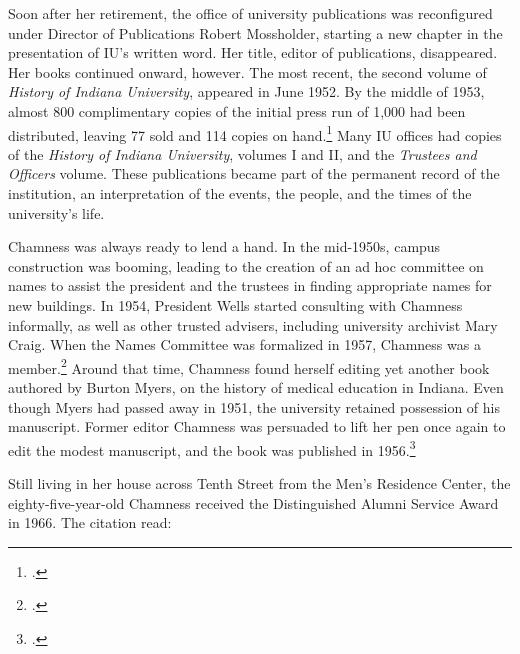 \documentclass[
  american,
  letterpaper,
]{scrreprt}
\begin{document}
Soon after her retirement, the office of university publications was
reconfigured under Director of Publications Robert Mossholder, starting
a new chapter in the presentation of IU's written word. Her title,
editor of publications, disappeared. Her books continued onward,
however. The most recent, the second volume of \emph{History of Indiana
University}, appeared in June 1952. By the middle of 1953, almost 800
complimentary copies of the initial press run of 1,000 had been
distributed, leaving 77 sold and 114 copies on hand.\footnote{.}
Many IU offices had copies of the \emph{History of Indiana University},
volumes I and II, and the \emph{Trustees and Officers} volume. These
publications became part of the permanent record of the institution, an
interpretation of the events, the people, and the times of the
university's life.

Chamness was always ready to lend a hand. In the mid-1950s, campus
construction was booming, leading to the creation of an ad hoc committee
on names to assist the president and the trustees in finding appropriate
names for new buildings. In 1954, President Wells started consulting
with Chamness informally, as well as other trusted advisers, including
university archivist Mary Craig. When the Names Committee was formalized
in 1957, Chamness was a member.\footnote{.} Around that time, Chamness found herself
editing yet another book authored by Burton Myers, on the history of
medical education in Indiana. Even though Myers had passed away in 1951,
the university retained possession of his manuscript. Former editor
Chamness was persuaded to lift her pen once again to edit the modest
manuscript, and the book was published in 1956.\footnote{.}

Still living in her house across Tenth Street from the Men's Residence
Center, the eighty-five-year-old Chamness received the Distinguished
Alumni Service Award in 1966. The citation read:
\end{document}
